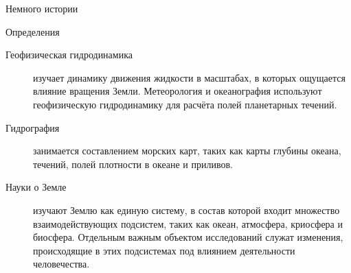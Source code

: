 \begin{chapter}{Немного истории}
\begin{section}{Определения}
\begin{description}
\item[Геофизическая гидродинамика] изучает динамику движения жидкости
в масштабах, в которых ощущается влияние вращения Земли. Метеорология и
океанография используют геофизическую гидродинамику для расчёта полей
планетарных течений.
%

\item[Гидрография] занимается составлением морских карт, таких как
карты глубины океана, течений, полей плотности в океане и приливов.
%

\item[Науки о Земле] изучают Землю как единую систему, в состав 
которой входит множество взаимодействующих подсистем, таких как океан, 
атмосфера, криосфера и биосфера.%
Отдельным важным объектом исследований
служат изменения, происходящие в этих подсистемах под влиянием деятельности
человечества.
%
\end{description}
\end{section}


\end{chapter}
